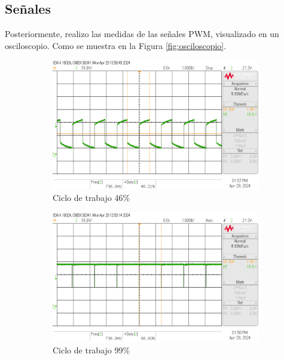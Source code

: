 \documentclass{article}
\begin{document}
\subsection{Señales}
Posteriormente, realizo las medidas de las señales PWM, visualizado en un osciloscopio. Como se muestra en la Figura \ref{fig:osciloscopio}.
\begin{figure}[H]
    \centering
    \begin{subfigure}{.3\textwidth}
        \centering
        \includegraphics[width=\linewidth]{images/scope_1.png}
        \caption{Ciclo de trabajo 46\%}
        \label{fig:pwm_1}
    \end{subfigure}%
    \hfill
    \begin{subfigure}{.3\textwidth}
        \centering
        \includegraphics[width=\linewidth]{images/scope_2.png}
        \caption{Ciclo de trabajo 99\%}
        \label{fig:pwm_2}
    \end{subfigure}
    \hfill
    \begin{subfigure}{.3\textwidth}

\end{subfigure}
\end{figure}
\end{document}
